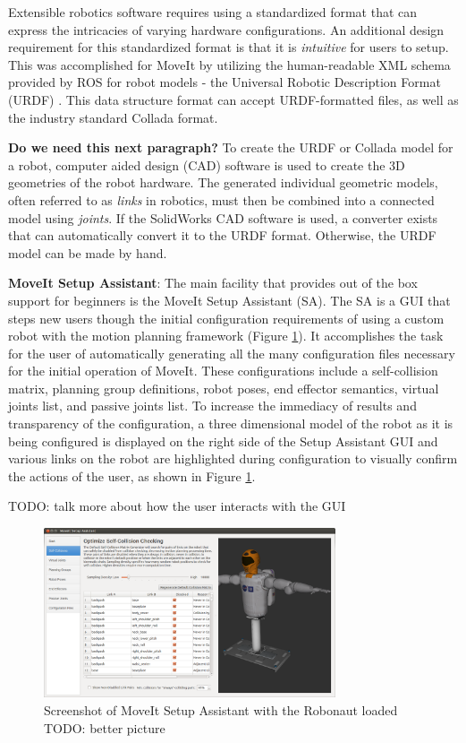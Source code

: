 \documentclass[10pt,journal,compsoc]{joser1}
\begin{document}
{Extensible robotics software requires using a standardized format that can express the intricacies of varying hardware configurations. An additional design requirement for this standardized format is that it is \textit{intuitive} for users to setup. This was accomplished for MoveIt by utilizing the human-readable XML schema provided by ROS for robot models - the Universal Robotic Description Format (URDF) \cite{urdf}. This data structure format can accept URDF-formatted files, as well as the industry standard Collada \cite{collada} format.

\textbf{Do we need this next paragraph?}
To create the URDF or Collada model for a robot, computer aided design (CAD) software is used to create the 3D geometries of the robot hardware. The generated individual geometric models, often referred to as \textit{links} in robotics, must then be combined into a connected model using \textit{joints}. If the SolidWorks CAD software is used, a converter exists that can automatically convert it to the URDF format. Otherwise, the URDF model can be made by hand.

{\bf MoveIt Setup Assistant}: The main facility that provides out of the box support for beginners is the MoveIt Setup Assistant (SA). The SA is a GUI that steps new users though the initial configuration requirements of using a custom robot with the motion planning framework (Figure \ref{fig:setupassistant}). It accomplishes the task for the user of automatically generating all the many configuration files necessary for the initial operation of MoveIt. These configurations include a self-collision matrix, planning group definitions, robot poses, end effector semantics, virtual joints list, and passive joints list. To increase the immediacy of results and transparency of the configuration, a three dimensional model of the robot as it is being configured is displayed on the right side of the Setup Assistant GUI and various links on the robot are highlighted during configuration to visually confirm the actions of the user, as shown in Figure \ref{fig:setupassistant}.

TODO: talk more about how the user interacts with the GUI

\begin{figure}[!t]
\centering
\includegraphics[width=3.4in]{images/setup_assistant}
\caption{Screenshot of MoveIt Setup Assistant with the Robonaut loaded TODO: better picture}
\label{fig:setupassistant}
\end{figure}

}
\end{document}
